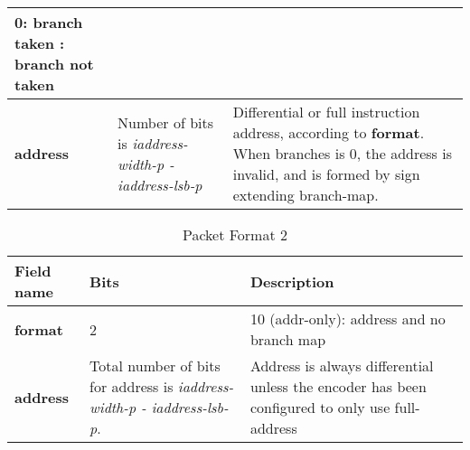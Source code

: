 \begin{table}[htp]
\begin{tabulary}{\textwidth}{|l|p{35mm}|p{80mm}|}
        0: branch taken : branch not taken \\
        \hline
        \textbf{address}	& Number of bits \newline 
                  is \textit {iaddress-width-p - iaddress-lsb-p} & 
                    Differential or full instruction address, according to \textbf {format}.  \newline
                    When branches is 0, the address is invalid, and is formed by sign extending branch-map.\\
        \hline
    \end{tabulary}
\end{table}


\begin{table}[!h]
    \centering
    \caption{Packet Format 2}
    \label{tab:te_inst2}
    \begin{tabulary}{\textwidth}{|l|p{35mm}|p{80mm}|}
        \hline
        {\bf Field name} & {\bf Bits} & {\bf Description} \\
        \hline
        \textbf{format}	& 2	& 10 (addr-only): address and no branch map\\
        \hline
        \textbf{address} & Total number of bits 
                  for address is
                  \textit {iaddress-width-p - iaddress-lsb-p}. & 
                  Address is always differential unless the encoder has been configured to only use full-address\\ 
        \hline
    \end{tabulary}
\end{table}

